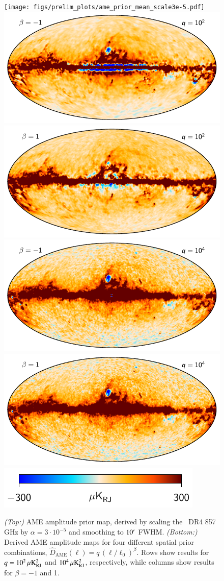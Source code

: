 \documentclass[twocolumn]{aa}
\begin{document}
\begin{figure}
  \center
  \texttt{[image: figs/prelim\_plots/ame\_prior\_mean\_scale3e-5.pdf]}\\ 
  \includegraphics[width=0.49\linewidth]{figs/ame_prior_amp100_beta-1.pdf}
  \includegraphics[width=0.49\linewidth]{figs/ame_prior_amp100_beta1.pdf}\\
  \includegraphics[width=0.49\linewidth]{figs/ame_prior_amp10000_beta-1.pdf}
  \includegraphics[width=0.49\linewidth]{figs/ame_prior_amp10000_beta1.pdf}\\
  \includegraphics[width=0.4\linewidth]{figs/colourbar_300uK_RJ.pdf}  
  \caption{\emph{(Top:)} AME amplitude prior map, derived by scaling
    the \Planck\ DR4 857\,GHz by $\alpha=3\cdot10^{-5}$ and smoothing
    to $10\arcm$ FWHM. \emph{(Bottom:)} Derived AME amplitude maps for four different spatial prior combinations, $\hat{D}_{\mathrm{AME}}(\ell) = q\,(\ell/\ell_{0})^{\beta}$. Rows show results for $q=10^2\muK_{\mathrm{RJ}}^2$ and $10^4\muK_{\mathrm{RJ}}^2$, respectively, while columns show results for $\beta=-1$ and 1.  }
  \label{fig:ame_amp_priors}
\end{figure}
\end{document}
